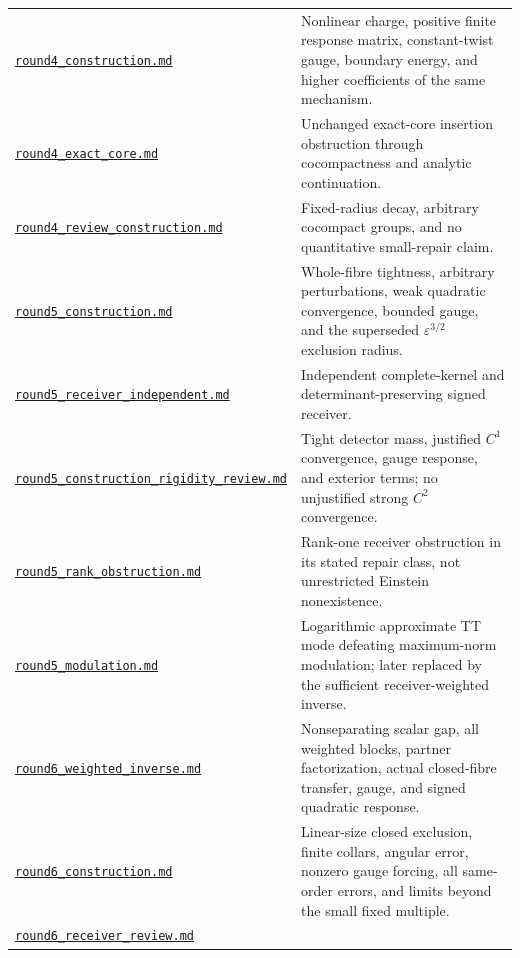 \documentclass[a4paper,11pt]{article}
\theoremstyle{definition}
\begin{document}
\begin{longtable}{L{.34\textwidth}L{.59\textwidth}}
\href{../references/rounds/round4_construction.md}{\nolinkurl{round4_construction.md}}
& Nonlinear charge, positive finite response matrix, constant-twist gauge, boundary energy, and higher coefficients of the same mechanism.\\
\href{../references/rounds/round4_exact_core.md}{\nolinkurl{round4_exact_core.md}}
& Unchanged exact-core insertion obstruction through cocompactness and analytic continuation.\\
\href{../references/rounds/round4_review_construction.md}{\nolinkurl{round4_review_construction.md}}
& Fixed-radius decay, arbitrary cocompact groups, and no quantitative small-repair claim.\\
\href{../references/rounds/round5_construction.md}{\nolinkurl{round5_construction.md}}
& Whole-fibre tightness, arbitrary perturbations, weak quadratic convergence, bounded gauge, and the superseded $\varepsilon^{3/2}$ exclusion radius.\\
\href{../references/rounds/round5_receiver_independent.md}{\nolinkurl{round5_receiver_independent.md}}
& Independent complete-kernel and determinant-preserving signed receiver.\\
\href{../references/rounds/round5_construction_rigidity_review.md}{\nolinkurl{round5_construction_rigidity_review.md}}
& Tight detector mass, justified $C^1$ convergence, gauge response, and exterior terms; no unjustified strong $C^2$ convergence.\\
\href{../references/rounds/round5_rank_obstruction.md}{\nolinkurl{round5_rank_obstruction.md}}
& Rank-one receiver obstruction in its stated repair class, not unrestricted Einstein nonexistence.\\
\href{../references/rounds/round5_modulation.md}{\nolinkurl{round5_modulation.md}}
& Logarithmic approximate TT mode defeating maximum-norm modulation; later replaced by the sufficient receiver-weighted inverse.\\
\href{../references/rounds/round6_weighted_inverse.md}{\nolinkurl{round6_weighted_inverse.md}}
& Nonseparating scalar gap, all weighted blocks, partner factorization, actual closed-fibre transfer, gauge, and signed quadratic response.\\
\href{../references/rounds/round6_construction.md}{\nolinkurl{round6_construction.md}}
& Linear-size closed exclusion, finite collars, angular error, nonzero gauge forcing, all same-order errors, and limits beyond the small fixed multiple.\\
\href{../references/rounds/round6_receiver_review.md}{\nolinkurl{round6_receiver_review.md}}

\end{longtable}
\end{document}
